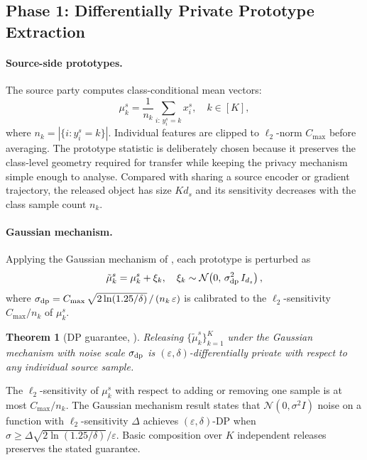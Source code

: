 \documentclass[a4paper,fleqn]{cas-sc}
\newtheorem{theorem}{Theorem}
\begin{document}
\subsection{Phase 1: Differentially Private Prototype Extraction}
\label{sec:phase1}

\paragraph{Source-side prototypes.}
The source party computes class-conditional mean vectors:
\begin{equation}
  \mu_k^s = \frac{1}{n_k}\sum_{i:\,y_i^s=k} x_i^s, \quad k \in [K],
  \label{eq:proto}
\end{equation}
where $n_k = |\{i : y_i^s = k\}|$. Individual features are clipped to
$\ell_2$-norm $C_{\max}$ before averaging.
The prototype statistic is deliberately chosen because it preserves the
class-level geometry required for transfer while keeping the privacy
mechanism simple enough to analyse. Compared with sharing a source encoder or
gradient trajectory, the released object has size $K d_s$ and its sensitivity
decreases with the class sample count $n_k$.

\paragraph{Gaussian mechanism.}
Applying the Gaussian mechanism of \citet{Balle2018}, each prototype
is perturbed as
\begin{equation}
  \tilde{\mu}_k^s = \mu_k^s + \xi_k, \quad
  \xi_k \sim \mathcal{N}\!\left(0,\,\sigma_{\rm dp}^2\, I_{d_s}\right),
  \label{eq:dp}
\end{equation}
where
$\sigma_{\rm dp} = C_{\max}\,\sqrt{2\ln(1.25/\delta)}\,/\,(n_k\,\varepsilon)$
is calibrated to the $\ell_2$-sensitivity $C_{\max}/n_k$ of $\mu_k^s$.

\begin{theorem}[DP guarantee, \citealt{Dwork2014,Balle2018}]
  Releasing $\{\tilde{\mu}_k^s\}_{k=1}^K$ under the Gaussian mechanism
  with noise scale $\sigma_{\rm dp}$ is $(\varepsilon,\delta)$-differentially
  private with respect to any individual source sample.
  \label{thm:dp}
\end{theorem}

\begin{pf}
  The $\ell_2$-sensitivity of $\mu_k^s$ with respect to adding or removing
  one sample is at most $C_{\max}/n_k$. The Gaussian mechanism result states
  that $\mathcal{N}(0,\sigma^2 I)$ noise on a function with $\ell_2$-sensitivity
  $\Delta$ achieves $(\varepsilon,\delta)$-DP when
  $\sigma \geq \Delta\sqrt{2\ln(1.25/\delta)}/\varepsilon$.
  Basic composition over $K$ independent releases preserves the stated
  guarantee.
\end{pf}
\end{document}
